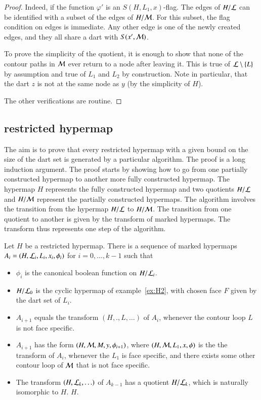 \begin{proof}
   Indeed, if the
function $\varphi'$ is an $S(H,L_1,x)$-flag.  The edges of $H/{\cal
L}$ can be identified with a subset of the edges of $H/{\cal M}$.
For this subset, the flag condition on edges is immediate.  Any
other edge is one of the newly created edges, and they all share a
dart with $S(x',{\cal M})$.

 To prove the simplicity of the quotient, it is enough to show that
none of the contour
paths in ${\cal M}$  ever return to a node after leaving it.
This is true of ${\cal L}\setminus\{L\}$ by assumption and true of
$L_1$ and $L_2$ by construction.  Note in particular, that the dart
$z$ is not at the same node as $y$ (by the simplicity of $H$).

The other verifications are routine.
\end{proof}

\subsection{restricted hypermap}

The aim is to prove that every restricted hypermap with a given bound
on the size of the dart set is generated by a particular algorithm.
The proof is a long induction argument.  The proof starts by showing
how to go from one partially constructed hypermap to another more
fully constructed hypermap.  The hypermap $H$ represents the fully
constructed hypermap and two quotients $H/{\cal L}$ and $H/{\cal M}$
represent the partially constructed hypermaps.  The algorithm involves
the transition from the hypermap $H/{\cal L}$ to $H/{\cal M}$.  The
transition from one quotient to another is given by the transform of
marked hypermaps.  The transform thus represents one step of the
algorithm.  %

\begin{lemma}  Let $H$ be a restricted hypermap.  
There is a sequence of marked hypermaps
$A_i = (H,{\cal L}_i,L_i,x_i,\phi_i)$ for $i=0,\ldots,k-1$ such that
\begin{itemize}
\item $\phi_i$ is the canonical boolean function on $H/{\cal L}_i$.
\item $H/{\cal L}_0$ is the cyclic hypermap of example~\ref{ex:H2}, with
chosen face $F$ given by the dart set of $L_i$.
\item $A_{i+1}$ equals the transform $(H,.,L,\ldots)$ of
$A_i$, whenever the contour loop $L$ is not face specific.
\item $A_{i+1}$ has the form $(H,{\cal M},M,y,\phi_{i+1})$, where $(H,{\cal M},L_1,x,\phi)$ is
the the transform of $A_i$, whenever the $L_1$ is face specific, and there exists some other contour loop of ${\cal M}$ that is not face specific.
\item The transform $(H,{\cal L}_k,\ldots)$ of $A_{k-1}$ has a quotient $H/{\cal L}_k$,
which is naturally isomorphic to $H$.  
  $H$.
\end{itemize}
\end{lemma}

